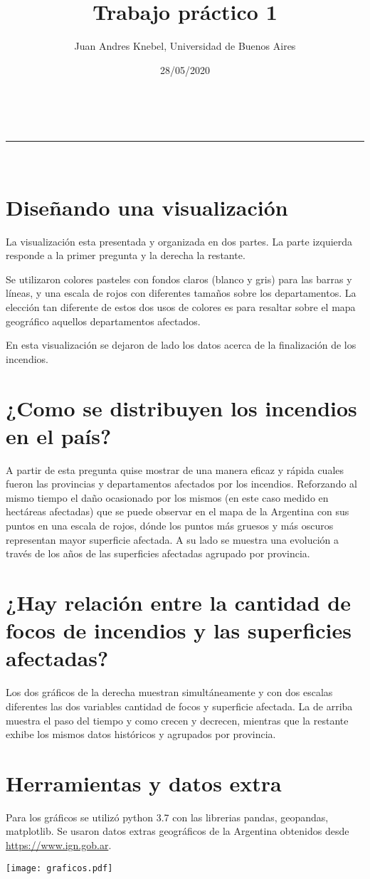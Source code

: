 \documentclass[a4paper,11pt]{article}
\makeatletter
\newcommand{\linia}{\rule{\linewidth}{0.5pt}}
\theoremstyle{mytheor}
\renewcommand{\maketitle}{
\begin{center}
\vspace{2ex}
{\huge \textsc{\@title}}
\vspace{1ex}
\\
\linia\\
\@author \hfill \@date
\vspace{4ex}
\end{center}
}
\makeatother
\begin{document}
\title{Trabajo práctico \textnumero{} 1}

\author{Juan Andres Knebel, Universidad de Buenos Aires}

\date{28/05/2020}

\maketitle

\section*{Diseñando una visualización}
La visualización esta presentada y organizada en dos partes. La parte izquierda responde a la primer pregunta y la derecha la restante.

Se utilizaron colores pasteles con fondos claros (blanco y gris) para las barras y líneas, y una escala de rojos con diferentes tamaños sobre los departamentos. La elección tan diferente de estos dos usos de colores es para resaltar sobre el mapa geográfico aquellos departamentos afectados.

En esta visualización se dejaron de lado los datos acerca de la finalización de los incendios.
\section{¿Como se distribuyen los incendios en el país?}
A partir de esta pregunta quise mostrar de una manera eficaz y rápida cuales fueron las provincias y departamentos afectados por los incendios. Reforzando al mismo tiempo el daño ocasionado por los mismos (en este caso medido en hectáreas afectadas) que se puede observar en el mapa de la Argentina con sus puntos en una escala de rojos, dónde los puntos más gruesos y más oscuros representan mayor superficie afectada.
A su lado se muestra una evolución a través de los años de las superficies afectadas agrupado por provincia.

\section{¿Hay relación entre la cantidad de focos de incendios y las superficies afectadas?}
Los dos gráficos de la derecha muestran simultáneamente y con dos escalas diferentes las dos variables cantidad de focos y superficie afectada. La de arriba muestra el paso del tiempo y como crecen y decrecen, mientras que la restante exhibe los mismos datos históricos y agrupados por provincia.
\section*{Herramientas y datos extra}
Para los gráficos se utilizó python 3.7 con las librerias pandas, geopandas, matplotlib. Se usaron datos extras geográficos de la Argentina obtenidos desde \url{https://www.ign.gob.ar}.

\begin{landscape}
\texttt{[image: graficos.pdf]}
\end{landscape}
\end{document}
